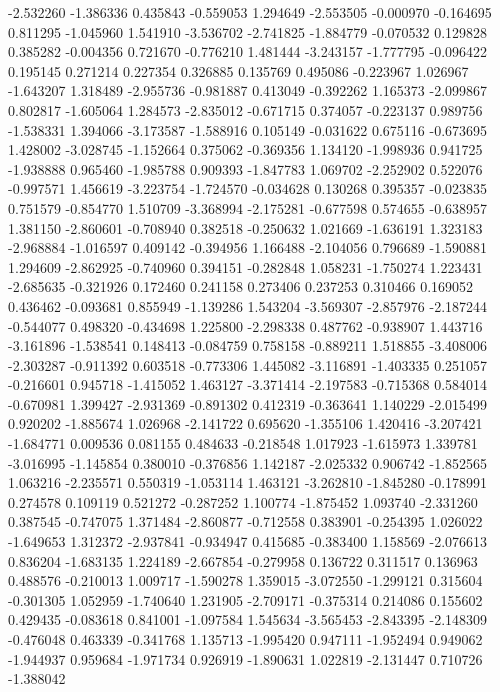 -2.532260
-1.386336
0.435843
-0.559053
1.294649
-2.553505
-0.000970
-0.164695
0.811295
-1.045960
1.541910
-3.536702
-2.741825
-1.884779
-0.070532
0.129828
0.385282
-0.004356
0.721670
-0.776210
1.481444
-3.243157
-1.777795
-0.096422
0.195145
0.271214
0.227354
0.326885
0.135769
0.495086
-0.223967
1.026967
-1.643207
1.318489
-2.955736
-0.981887
0.413049
-0.392262
1.165373
-2.099867
0.802817
-1.605064
1.284573
-2.835012
-0.671715
0.374057
-0.223137
0.989756
-1.538331
1.394066
-3.173587
-1.588916
0.105149
-0.031622
0.675116
-0.673695
1.428002
-3.028745
-1.152664
0.375062
-0.369356
1.134120
-1.998936
0.941725
-1.938888
0.965460
-1.985788
0.909393
-1.847783
1.069702
-2.252902
0.522076
-0.997571
1.456619
-3.223754
-1.724570
-0.034628
0.130268
0.395357
-0.023835
0.751579
-0.854770
1.510709
-3.368994
-2.175281
-0.677598
0.574655
-0.638957
1.381150
-2.860601
-0.708940
0.382518
-0.250632
1.021669
-1.636191
1.323183
-2.968884
-1.016597
0.409142
-0.394956
1.166488
-2.104056
0.796689
-1.590881
1.294609
-2.862925
-0.740960
0.394151
-0.282848
1.058231
-1.750274
1.223431
-2.685635
-0.321926
0.172460
0.241158
0.273406
0.237253
0.310466
0.169052
0.436462
-0.093681
0.855949
-1.139286
1.543204
-3.569307
-2.857976
-2.187244
-0.544077
0.498320
-0.434698
1.225800
-2.298338
0.487762
-0.938907
1.443716
-3.161896
-1.538541
0.148413
-0.084759
0.758158
-0.889211
1.518855
-3.408006
-2.303287
-0.911392
0.603518
-0.773306
1.445082
-3.116891
-1.403335
0.251057
-0.216601
0.945718
-1.415052
1.463127
-3.371414
-2.197583
-0.715368
0.584014
-0.670981
1.399427
-2.931369
-0.891302
0.412319
-0.363641
1.140229
-2.015499
0.920202
-1.885674
1.026968
-2.141722
0.695620
-1.355106
1.420416
-3.207421
-1.684771
0.009536
0.081155
0.484633
-0.218548
1.017923
-1.615973
1.339781
-3.016995
-1.145854
0.380010
-0.376856
1.142187
-2.025332
0.906742
-1.852565
1.063216
-2.235571
0.550319
-1.053114
1.463121
-3.262810
-1.845280
-0.178991
0.274578
0.109119
0.521272
-0.287252
1.100774
-1.875452
1.093740
-2.331260
0.387545
-0.747075
1.371484
-2.860877
-0.712558
0.383901
-0.254395
1.026022
-1.649653
1.312372
-2.937841
-0.934947
0.415685
-0.383400
1.158569
-2.076613
0.836204
-1.683135
1.224189
-2.667854
-0.279958
0.136722
0.311517
0.136963
0.488576
-0.210013
1.009717
-1.590278
1.359015
-3.072550
-1.299121
0.315604
-0.301305
1.052959
-1.740640
1.231905
-2.709171
-0.375314
0.214086
0.155602
0.429435
-0.083618
0.841001
-1.097584
1.545634
-3.565453
-2.843395
-2.148309
-0.476048
0.463339
-0.341768
1.135713
-1.995420
0.947111
-1.952494
0.949062
-1.944937
0.959684
-1.971734
0.926919
-1.890631
1.022819
-2.131447
0.710726
-1.388042
